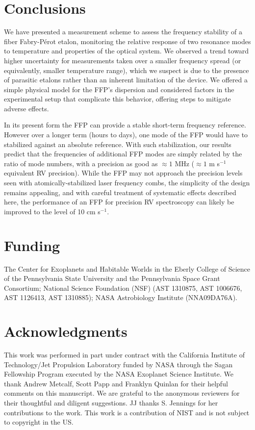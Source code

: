 \documentclass[10pt]{article}
\newcommand{\fabper}{Fabry-P{\'e}rot}
\begin{document}
\section{Conclusions}
We have presented a measurement scheme to assess the frequency stability of a fiber {\fabper} etalon, monitoring the relative response of two resonance modes to temperature and properties of the optical system. We observed a trend toward higher uncertainty for measurements taken over a smaller frequency spread (or equivalently, smaller temperature range), which we suspect is due to the presence of parasitic etalons rather than an inherent limitation of the device. We offered a simple physical model for the FFP's dispersion and considered factors in the experimental setup that complicate this behavior, offering steps to mitigate adverse effects. 

In its present form the FFP can provide a stable short-term frequency reference.  However over a longer term (hours to days), one mode of the FFP would have to stabilized against an absolute reference.  With such stabilization, our results predict that the frequencies of additional FFP modes are simply related by the ratio of mode numbers, with a precision as good as $\approx 1$ MHz ($\approx 1$ m s$^{-1}$ equivalent RV precision).  While the FFP may not approach the precision levels seen with atomically-stabilized laser frequency combs, the simplicity of the design remains appealing, and with careful treatment of systematic effects described here, the performance of an FFP for precision RV spectroscopy can likely be improved to the level of 10 cm s$^{-1}$.

\section*{Funding}
The Center for Exoplanets and Habitable Worlds in the Eberly College of Science of the Pennsylvania State University and the Pennsylvania Space Grant Consortium; National Science Foundation (NSF) (AST 1310875, AST 1006676, AST 1126413, AST 1310885); NASA Astrobiology Institute (NNA09DA76A).

\section*{Acknowledgments}
This work was performed in part under contract with the 
California Institute of Technology/Jet Propulsion Laboratory funded by NASA through the Sagan Fellowship Program executed by the NASA Exoplanet Science Institute.  We thank Andrew Metcalf, Scott Papp and Franklyn Quinlan for their helpful comments on this manuscript. We are grateful to the anonymous reviewers for their thoughtful and diligent suggestions. JJ thanks S. Jennings for her contributions to the work. This work is a contribution of NIST and is not subject to copyright in the US.
\end{document}
